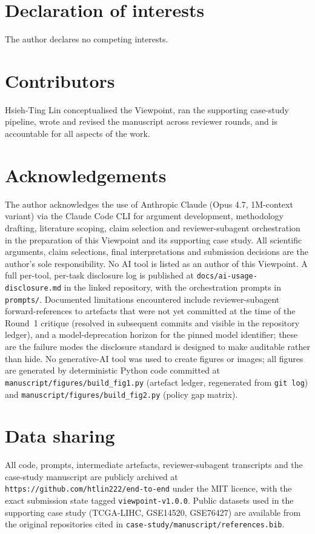\documentclass[11pt,a4paper]{article}
\begin{document}
\section*{Declaration of interests}
The author declares no competing interests.

\section*{Contributors}
Hsieh-Ting Lin conceptualised the Viewpoint, ran the supporting case-study pipeline, wrote and revised the manuscript across reviewer rounds, and is accountable for all aspects of the work.

\section*{Acknowledgements}
The author acknowledges the use of Anthropic Claude (Opus 4.7, 1M-context variant) via the Claude Code CLI for argument development, methodology drafting, literature scoping, claim selection and reviewer-subagent orchestration in the preparation of this Viewpoint and its supporting case study. All scientific arguments, claim selections, final interpretations and submission decisions are the author's sole responsibility. No AI tool is listed as an author of this Viewpoint. A full per-tool, per-task disclosure log is published at \texttt{docs/ai-usage-disclosure.md} in the linked repository, with the orchestration prompts in \texttt{prompts/}. Documented limitations encountered include reviewer-subagent forward-references to artefacts that were not yet committed at the time of the Round~1 critique (resolved in subsequent commits and visible in the repository ledger), and a model-deprecation horizon for the pinned model identifier; these are the failure modes the disclosure standard is designed to make auditable rather than hide. No generative-AI tool was used to create figures or images; all figures are generated by deterministic Python code committed at \texttt{manuscript/figures/build\_fig1.py} (artefact ledger, regenerated from \texttt{git log}) and \texttt{manuscript/figures/build\_fig2.py} (policy gap matrix).

\section*{Data sharing}
All code, prompts, intermediate artefacts, reviewer-subagent transcripts and the case-study manuscript are publicly archived at \texttt{https://github.com/htlin222/end-to-end} under the MIT licence, with the exact submission state tagged \texttt{viewpoint-v1.0.0}. Public datasets used in the supporting case study (TCGA-LIHC, GSE14520, GSE76427) are available from the original repositories cited in \texttt{case-study/manuscript/references.bib}.



\end{document}
